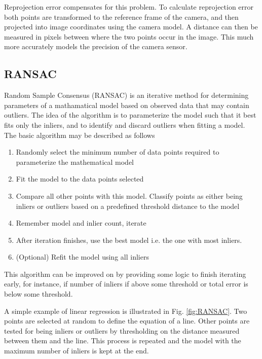 Reprojection error compensates for this problem.  To calculate reprojection error both points are transformed to the reference frame of the camera, and then projected into image coordinates using the camera model.  A distance can then be measured in pixels between where the two points occur in the image.  This much more accurately models the precision of the camera sensor.

\subsection{RANSAC}
\label{subsec:RANSAC}

Random Sample Consensus (RANSAC) is an iterative method for determining parameters of a mathamatical model based on observed data that may contain outliers.  The idea of the algorithm is to parameterize the model such that it best fits only the inliers, and to identify and discard outliers when fitting a model.  The basic algorithm may be described as follows

\begin{enumerate}
 \item Randomly select the minimum number of data points required to parameterize the mathematical model
 \item Fit the model to the data points selected
 \item Compare all other points with this model.  Classify points as either being inliers or outliers based on a predefined threshold distance to the model
 \item Remember model and inlier count, iterate
 \item After iteration finishes, use the best model i.e. the one with most inliers.
 \item (Optional) Refit the model using all inliers
\end{enumerate}

This algorithm can be improved on by providing some logic to finish iterating early, for instance, if number of inliers if above some threshold or total error is below some threshold.

A simple example of linear regression is illustrated in Fig. \ref{fig:RANSAC}.  Two points are selected at random to define the equation of a line.  Other points are tested for being inliers or outliers by thresholding on the distance measured between them and the line.  This process is repeated and the model with the maximum number of inliers is kept at the end.

